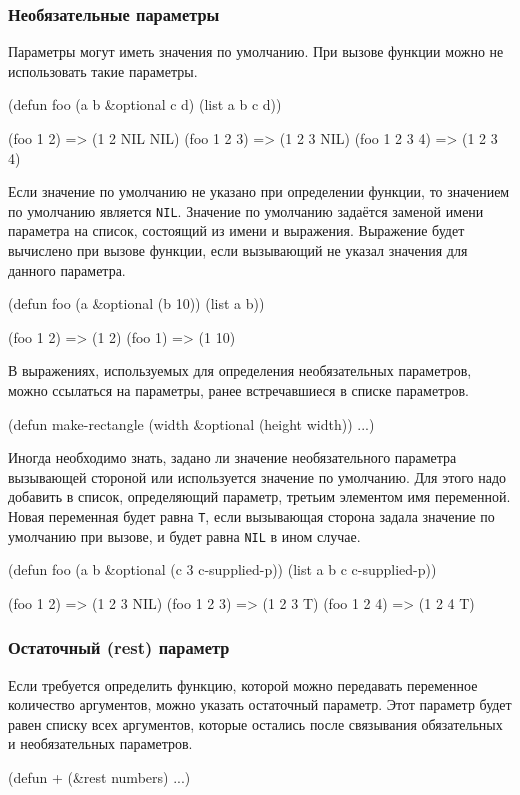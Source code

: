 \subsubsection{Необязательные параметры}
Параметры могут иметь значения по умолчанию. При вызове функции можно не использовать такие параметры.
\begin{cllst}{}{}
(defun foo (a b &optional c d) 
  (list a b c d))

(foo 1 2)     => (1 2 NIL NIL)
(foo 1 2 3)   => (1 2 3 NIL)
(foo 1 2 3 4) => (1 2 3 4)
\end{cllst}

Если значение по умолчанию не указано при определении функции, то значением по умолчанию является \lstinline{NIL}. Значение по умолчанию задаётся заменой имени параметра на список, состоящий из имени и выражения. Выражение будет вычислено при вызове функции, если вызывающий не указал значения для данного параметра.
\begin{cllst}{}{}
(defun foo (a &optional (b 10)) 
    (list a b))

(foo 1 2) => (1 2)
(foo 1)   => (1 10)
\end{cllst}

В выражениях, используемых для определения необязательных параметров, можно ссылаться на параметры, ранее встречавшиеся в списке параметров.
\begin{cllst}{}{}
(defun make-rectangle (width &optional (height width)) 
  ...)
\end{cllst}

Иногда необходимо знать, задано ли значение необязательного параметра вызывающей стороной или используется значение по умолчанию. Для этого надо добавить в список, определяющий параметр, третьим элементом имя переменной. Новая переменная будет равна \lstinline{T}, если вызывающая сторона задала значение по умолчанию при вызове, и будет равна \lstinline{NIL} в ином случае.
\begin{cllst}{}{}
(defun foo (a b &optional (c 3 c-supplied-p))
  (list a b c c-supplied-p))

(foo 1 2)   => (1 2 3 NIL)
(foo 1 2 3) => (1 2 3 T)
(foo 1 2 4) => (1 2 4 T)
\end{cllst}

\subsubsection{Остаточный (rest) параметр}
Если требуется определить функцию, которой можно передавать переменное количество аргументов, можно указать остаточный параметр. Этот параметр будет равен списку всех аргументов, которые остались после связывания обязательных и необязательных параметров.
\begin{cllst}{}{}
(defun + (&rest numbers) ...)
\end{cllst}

